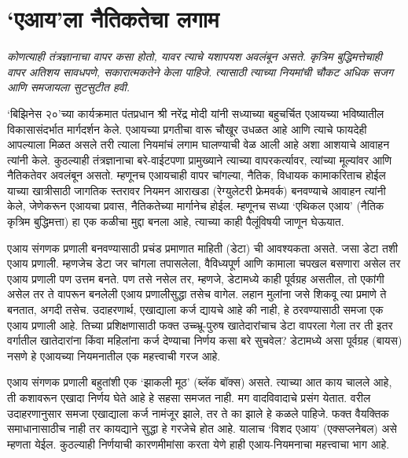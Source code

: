 \chapter{`एआय'ला नैतिकतेचा लगाम}

{\textit{कोणत्याही तंत्रज्ञानाचा वापर कसा होतो,  यावर त्याचे यशापयश अवलंबून असते.  कृत्रिम बुद्धिमत्तेचाही वापर अतिशय सावधपणे,  सकारात्मकतेने केला पाहिजे. त्यासाठी त्याच्या नियमांची चौकट अधिक सजग आणि समजायला सुटसुटीत हवी. }}

\vspace{1.5em}

`बिझिनेस २०'च्या कार्यक्रमात पंतप्रधान श्री नरेंद्र मोदी यांनी सध्याच्या बहुचर्चित एआयच्या भविष्यातील विकासासंदर्भात मार्गदर्शन केले. एआयच्या प्रगतीचा वारू चौखूर उधळत आहे आणि त्याचे फायदेही आपल्याला मिळत असले तरी त्याला नियमांचं लगाम घालण्याची वेळ आली आहे अशा आशयाचे आवाहन त्यांनी केले. कुठल्याही तंत्रज्ञानाचा बरे-वाईटपणा प्रामुख्याने त्याच्या वापरकर्त्यावर, त्यांच्या मूल्यांवर आणि नैतिकतेवर अवलंबून असतो. म्हणूनच एआयचाही वापर चांगल्या, नैतिक, विधायक कामाकरिताच होईल याच्या खात्रीसाठी जागतिक स्तरावर नियमन आराखडा (रेग्युलेटरी फ्रेमवर्क) बनवण्याचे आवाहन त्यांनी केले, जेणेकरून एआयचा प्रवास, नैतिकतेच्या मार्गानेच होईल. म्हणूनच सध्या `एथिकल एआय' (नैतिक कृत्रिम बुद्धिमत्ता) हा एक कळीचा मुद्दा बनला आहे, त्याच्या काही पैलूंविषयी जाणून घेऊयात.

एआय संगणक प्रणाली बनवण्यासाठी प्रचंड प्रमाणात माहिती (डेटा) ची आवश्यकता असते. जसा डेटा तशी एआय प्रणाली. म्हणजेच डेटा जर चांगला तपासलेला, वैविध्यपूर्ण आणि कामाला चपखल बसणारा असेल तर एआय प्रणाली पण उत्तम बनते. पण तसे नसेल तर, म्हणजे, डेटामध्ये काही पूर्वग्रह असतील, तो एकांगी असेल तर ते वापरून बनलेली एआय प्रणालीसुद्धा तसेच वागेल. लहान मुलांना जसे शिकवू त्या प्रमाणे ते बनतात, अगदी तसेच. उदाहरणार्थ, एखाद्याला कर्ज द्यायचे आहे की नाही, हे ठरवण्यासाठी समजा एक एआय प्रणाली आहे. तिच्या प्रशिक्षणासाठी फक्त उच्च्भ्रू-पुरुष खातेदारांचाच डेटा वापरला गेला तर ती इतर वर्गातील खातेदारांना किंवा महिलांना कर्ज देण्याचा निर्णय कसा बरे सुचवेल? डेटामध्ये असा पूर्वग्रह (बायस) नसणे हे एआयच्या नियमनातील एक महत्त्वाची गरज आहे.

एआय संगणक प्रणाली बहुतांशी एक `झाकली मूठ' (ब्लॅक बॉक्स) असते. त्याच्या आत काय चालले आहे, ती कशावरून एखादा निर्णय घेते आहे हे सहसा समजत नाही. मग वादविवादाचे प्रसंग येतात. वरील उदाहरणानुसार समजा एखाद्याला कर्ज नामंजूर झाले, तर ते का झाले हे कळले पाहिजे. फक्त वैयक्तिक समाधानासाठीच नाही तर कायद्याने सुद्धा हे गरजेचे होत आहे. यालाच `विशद एआय' (एक्सप्लनेबल) असे म्हणता येईल. कुठल्याही निर्णयाची कारणमीमांसा करता येणे हाही एआय-नियमनाचा महत्त्वाचा  भाग आहे.


